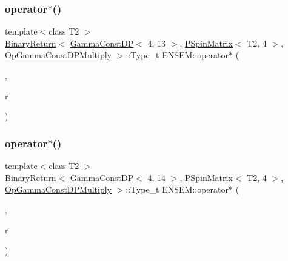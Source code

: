 \subsubsection{\texorpdfstring{operator$\ast$()}{operator*()}\hspace{0.1cm}{\footnotesize\ttfamily [46/64]}}
{\footnotesize\ttfamily template$<$class T2 $>$ \\
\mbox{\hyperlink{structENSEM_1_1BinaryReturn}{Binary\+Return}}$<$ \mbox{\hyperlink{classENSEM_1_1GammaConstDP}{Gamma\+Const\+DP}}$<$ 4, 13 $>$, \mbox{\hyperlink{classENSEM_1_1PSpinMatrix}{P\+Spin\+Matrix}}$<$ T2, 4 $>$, \mbox{\hyperlink{structENSEM_1_1OpGammaConstDPMultiply}{Op\+Gamma\+Const\+D\+P\+Multiply}} $>$\+::Type\+\_\+t E\+N\+S\+E\+M\+::operator$\ast$ (\begin{DoxyParamCaption}\item[{const \mbox{\hyperlink{classENSEM_1_1GammaConstDP}{Gamma\+Const\+DP}}$<$ 4, 13 $>$ \&}]{,  }\item[{const \mbox{\hyperlink{classENSEM_1_1PSpinMatrix}{P\+Spin\+Matrix}}$<$ T2, 4 $>$ \&}]{r }\end{DoxyParamCaption})\hspace{0.3cm}{\ttfamily [inline]}}

\mbox{\label{group__primspinmatrix_ga3572342590fe6c5683d22d857b757675}} 
\subsubsection{\texorpdfstring{operator$\ast$()}{operator*()}\hspace{0.1cm}{\footnotesize\ttfamily [47/64]}}
{\footnotesize\ttfamily template$<$class T2 $>$ \\
\mbox{\hyperlink{structENSEM_1_1BinaryReturn}{Binary\+Return}}$<$ \mbox{\hyperlink{classENSEM_1_1GammaConstDP}{Gamma\+Const\+DP}}$<$ 4, 14 $>$, \mbox{\hyperlink{classENSEM_1_1PSpinMatrix}{P\+Spin\+Matrix}}$<$ T2, 4 $>$, \mbox{\hyperlink{structENSEM_1_1OpGammaConstDPMultiply}{Op\+Gamma\+Const\+D\+P\+Multiply}} $>$\+::Type\+\_\+t E\+N\+S\+E\+M\+::operator$\ast$ (\begin{DoxyParamCaption}\item[{const \mbox{\hyperlink{classENSEM_1_1GammaConstDP}{Gamma\+Const\+DP}}$<$ 4, 14 $>$ \&}]{,  }\item[{const \mbox{\hyperlink{classENSEM_1_1PSpinMatrix}{P\+Spin\+Matrix}}$<$ T2, 4 $>$ \&}]{r }\end{DoxyParamCaption})\hspace{0.3cm}{\ttfamily [inline]}}

